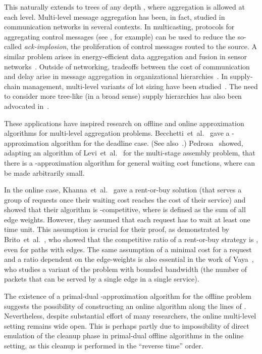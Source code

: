 \documentclass[a4paper]{article}
\newcommand{\etal}{et~al.}
\begin{document}
This naturally
extends to trees of any depth , where aggregation is allowed at each level.
Multi-level message aggregation has been, in fact, studied in 
communication networks in several contexts. In multicasting, protocols for aggregating
control messages (see \cite{bortnikov_cohen_infocom_98,badrinath_sudame_gathercast_00}, for example)
can be used to reduce the so-called \emph{ack-implosion}, the
proliferation of control messages routed to the source.
A similar problem arises in energy-efficient data aggregation and fusion in
sensor networks~\cite{hu_cao_may_sensors_05,yuan_et_al_data_fusion_03}.
Outside of networking, tradeoffs between the cost of communication and delay arise in
message aggregation in organizational hierarchies~\cite{Papadimitriou_96}.
In supply-chain management, multi-level variants of lot sizing have been
studied~\cite{wallance_et_al_multistage_assembly_73,kims_multilevel_lot_sizing_97}.
The need to consider more tree-like (in a broad sense) supply hierarchies
has also been advocated in~\cite{Lambert_Cooper_issues_chain_management_00}.

These applications have inspired research on offline and online
approximation algorithms for multi-level aggregation problems.
Becchetti~{\etal}~\cite{packet-aggregation-becchetti} gave a -approximation
algorithm for the deadline case. (See also~\cite{aggregation-bkv}.)
Pedrosa~\cite{lehilton-note} showed, adapting an algorithm of
Levi~{\etal}~\cite{jrp-levi-2-approx} for the multi-stage assembly problem,
that there is a -approximation algorithm for general waiting cost functions, 
where  can be made arbitrarily small.

In the online case,
Khanna~{\etal}~\cite{khanna-message-aggregation} gave a rent-or-buy solution
(that serves a group of requests once their waiting cost reaches the cost
of their service) and showed that their algorithm is -competitive,
where  is defined as the sum of all edge weights. 
However, they assumed that
each request has to wait at least one time unit. This assumption is crucial for their
proof, as demonstrated by Brito~{\etal}~\cite{aggregation-bkv}, who showed that
the competitive ratio of a rent-or-buy strategy is , even
for paths with  edges. 
The same assumption of a minimal cost for a request and a ratio dependent
on the edge-weights is also essential in the work of
Vaya~\cite{Vaya_delay_deliver_12}, who studies a variant of the
problem with bounded bandwidth (the number of packets that can be
served by a single edge in a single service).

The existence of a primal-dual -approximation algorithm \cite{lehilton-note, jrp-levi-2-approx}
for the offline problem suggests the possibility of constructing an online algorithm along the lines of \cite{online-primal-dual-book}. Nevertheless, despite substantial effort of many researchers,
the online multi-level setting remains wide open.
This is perhaps partly due to impossibility of direct emulation of
the cleanup phase in primal-dual offline algorithms in the online setting, 
as this cleanup is performed in the ``reverse time'' order.
\end{document}
